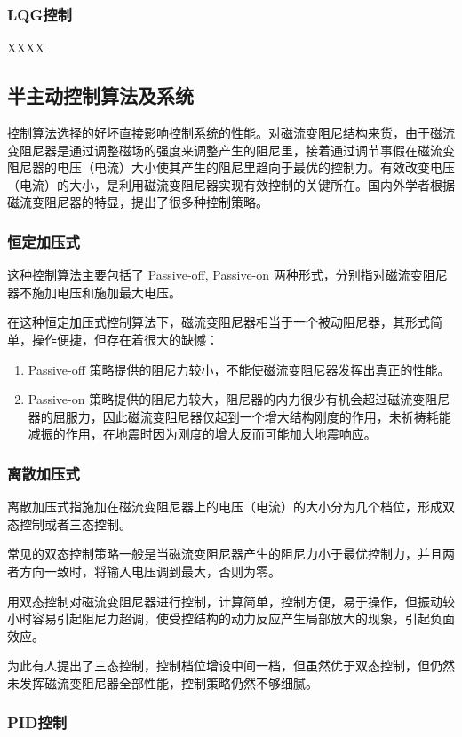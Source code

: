 \subsubsection{LQG控制}
XXXX

\subsection{半主动控制算法及系统}
控制算法选择的好坏直接影响控制系统的性能。对磁流变阻尼结构来货，由于磁流变阻尼器是通过调整磁场的强度来调整产生的阻尼里，接着通过调节事假在磁流变阻尼器的电压（电流）大小使其产生的阻尼里趋向于最优的控制力。有效改变电压（电流）的大小，是利用磁流变阻尼器实现有效控制的关键所在。国内外学者根据磁流变阻尼器的特显，提出了很多种控制策略。

\subsubsection{恒定加压式}
这种控制算法主要包括了 Passive-off, Passive-on 两种形式，分别指对磁流变阻尼器不施加电压和施加最大电压。

在这种恒定加压式控制算法下，磁流变阻尼器相当于一个被动阻尼器，其形式简单，操作便捷，但存在着很大的缺憾：
\begin{enumerate}
\item Passive-off 策略提供的阻尼力较小，不能使磁流变阻尼器发挥出真正的性能。
\item Passive-on 策略提供的阻尼力较大，阻尼器的内力很少有机会超过磁流变阻尼器的屈服力，因此磁流变阻尼器仅起到一个增大结构刚度的作用，未祈祷耗能减振的作用，在地震时因为刚度的增大反而可能加大地震响应。
\end{enumerate}

\subsubsection{离散加压式}
离散加压式指施加在磁流变阻尼器上的电压（电流）的大小分为几个档位，形成双态控制或者三态控制。

常见的双态控制策略一般是当磁流变阻尼器产生的阻尼力小于最优控制力，并且两者方向一致时，将输入电压调到最大，否则为零。

用双态控制对磁流变阻尼器进行控制，计算简单，控制方便，易于操作，但振动较小时容易引起阻尼力超调，使受控结构的动力反应产生局部放大的现象，引起负面效应。

为此有人提出了三态控制，控制档位增设中间一档，但虽然优于双态控制，但仍然未发挥磁流变阻尼器全部性能，控制策略仍然不够细腻。

\subsubsection{PID控制}

